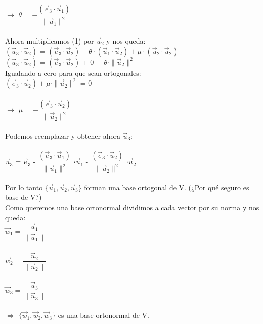\documentclass{article}
\begin{document}
$\rightarrow$ $\theta$ = $- \dfrac{(\vec{e}_3\cdot\vec{u}_1)}{\parallel\vec{u}_1\parallel^2}$\\\\
Ahora multiplicamos (1) por $\vec{u}_2$ y nos queda:\\
$(\vec{u}_3\cdot\vec{u}_2)$ = $(\vec{e}_3\cdot\vec{u}_2) + \theta\cdot(\vec{u}_1\cdot\vec{u}_2) + \mu \cdot (\vec{u}_2\cdot\vec{u}_2)$ \\
$(\vec{u}_3\cdot\vec{u}_2)$ = $(\vec{e}_3\cdot\vec{u}_2)$ + 0 + $\theta\cdot\parallel\vec{u}_2\parallel^2$\\
Igualando a cero para que sean ortogonales: \\
$(\vec{e}_3\cdot\vec{u}_2) + \mu\cdot\parallel\vec{u}_2\parallel^2$ = 0\\\\
$\rightarrow$ $\mu$ = $- \dfrac{(\vec{e}_3\cdot\vec{u}_2)}{\parallel\vec{u}_2\parallel^2}$\\\\
Podemos reemplazar y obtener ahora $\vec{u}_3$: \\\\
$\vec{u}_3$ = $\vec{e}_3$ - $\dfrac{(\vec{e}_3\cdot\vec{u}_1)}{\parallel\vec{u}_1\parallel^2}$ $\cdot\vec{u}_1$ - $\dfrac{(\vec{e}_3\cdot\vec{u}_2)}{\parallel\vec{u}_2\parallel^2}$ $\cdot\vec{u}_2$  \\\\
Por lo tanto $\{\vec{u}_1,\vec{u}_2,\vec{u}_3\}$ forman una base ortogonal de V. (¿Por qué seguro es base de V?)\\
Como queremos una base ortonormal dividimos a cada vector por su norma y nos queda: \\
$\vec{w}_1 = \dfrac{\vec{u}_1}{\parallel\vec{u}_1\parallel}$ \\\\
$\vec{w}_2 = \dfrac{\vec{u}_2}{\parallel\vec{u}_2\parallel}$ \\\\
$\vec{w}_3 = \dfrac{\vec{u}_3}{\parallel\vec{u}_3\parallel}$ \\\\
$\Rightarrow$ $\{\vec{w}_1,\vec{w}_2,\vec{w}_3\}$ es una base ortonormal de V.
\end{document}

